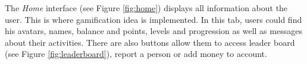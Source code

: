 The \emph{Home} interface (see Figure \ref {fig:home}) displays all information about the user. This is where gamification idea is implemented. In this tab, users could find his avatars, names,  balance and points, levels and progression as well as messages about their activities. There are also buttons allow them to access leader board (see Figure \ref{fig:leaderboard}), report a person or add money to account. 
